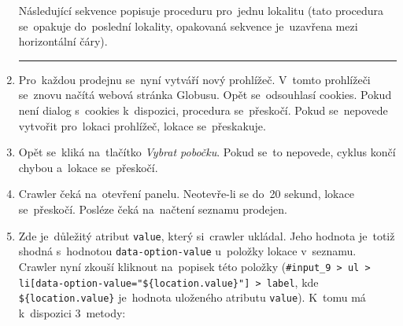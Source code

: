 \begin{enumerate}
        Následující sekvence popisuje proceduru pro~jednu lokalitu (tato
        procedura se~opakuje do~poslední lokality, opakovaná sekvence
        je~uzavřena mezi horizontální čáry).
        \medskip  \hrule
    \item Pro~každou prodejnu se~nyní vytváří nový prohlížeč. V~tomto
        prohlížeči se~znovu načítá webová stránka Globusu. Opět
        se~odsouhlasí cookies. Pokud není dialog s~cookies k~dispozici,
        procedura se~přeskočí. Pokud se~nepovede vytvořit pro~lokaci
        prohlížeč, lokace se~přeskakuje.
    \item Opět se~kliká na~tlačítko \emph{Vybrat pobočku}. Pokud se~to
        nepovede, cyklus končí chybou a~lokace se~přeskočí.
    \item Crawler čeká na~otevření panelu. Neotevře-li se do~20 sekund,
        lokace se~přeskočí. Posléze čeká na~načtení seznamu prodejen.
    \item Zde je~důležitý atribut \texttt{value}, který si~crawler ukládal.
        Jeho hodnota je~totiž shodná s~hodnotou \texttt{data-option-value}
        u~položky lokace v~seznamu. Crawler nyní zkouší kliknout na~popisek
        této položky (\texttt{\#input\_9 > ul >
        li[data-option-value="\$\{location.value\}"] > label},
        kde \texttt{\$\{location.value\}} je~hodnota uloženého atributu
        \texttt{value}). K~tomu má k~dispozici 3~metody:
        

\end{enumerate}
